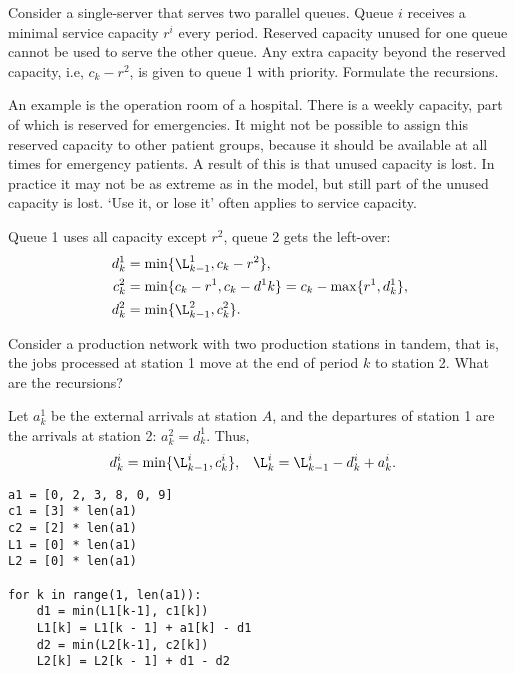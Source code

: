 \begin{exercise}\label{ex:l-118}
 Consider  a single-server that serves two parallel queues.
 Queue $i$ receives a minimal service capacity $r^i$ every period.
 Reserved capacity unused for one queue cannot be used to serve the other queue.
 Any extra capacity beyond the reserved capacity, i.e, $c_k - r^2$,  is given to queue 1 with priority.
 Formulate the recursions.

An example is  the operation room of a hospital.
There is a weekly capacity, part of which is reserved for emergencies.
It might not be possible to assign this reserved capacity to other patient groups, because it should be available at all times for emergency patients.
A result of this is that unused capacity is lost.
In practice it may not be as extreme as in the model, but still part
of the unused capacity is lost. `Use it, or lose it' often applies to service capacity.
\begin{solution}
 Queue 1 uses all capacity except $r^2$, queue 2 gets the left-over:
  \begin{align*}
    d^1_{ k} &= \min\{\L^1_{k-1}, c_k - r^2\}, \\
    c^2_{ k} &= \min\{c_k-r^1, c_k-d^1{ k}\} = c_k - \max\{r^1, d^1_{ k}\}, \\
    d^2_{ k} &= \min\{\L^2_{k-1}, c^2_k\}.
  \end{align*}
\end{solution}
\end{exercise}




\begin{exercise}\label{ex:l-119}
 Consider a production network with two production stations in tandem, that is, the jobs processed at station 1 move at the end of  period $k$ to station 2.
 What are the recursions?
\begin{solution}
  Let $a^1_k$ be the external arrivals at station $A$, and the departures of station 1 are the arrivals at station 2: $a_k^2 = d_{k}^1$.
  Thus,
\begin{align*}
 d^i_k &= \min\{\L_{k-1}^i, c_k^i\}, & \L_k^i &= \L_{k-1}^i -d_k^i + a_k^i.
 \end{align*}

\begin{verbatim}
a1 = [0, 2, 3, 8, 0, 9]
c1 = [3] * len(a1)
c2 = [2] * len(a1)
L1 = [0] * len(a1)
L2 = [0] * len(a1)

for k in range(1, len(a1)):
    d1 = min(L1[k-1], c1[k])
    L1[k] = L1[k - 1] + a1[k] - d1
    d2 = min(L2[k-1], c2[k])
    L2[k] = L2[k - 1] + d1 - d2
\end{verbatim}
\end{solution}
\end{exercise}

